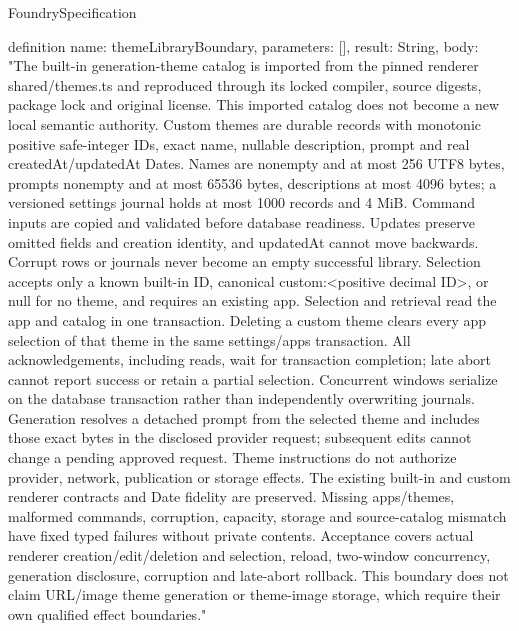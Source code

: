 \begin{lexlean}{FoundrySpecification}
\begin{semanticmodule}
definition{
  name: themeLibraryBoundary,
  parameters: [],
  result: String,
  body: "The built-in generation-theme catalog is imported from the pinned renderer shared/themes.ts and reproduced through its locked compiler, source digests, package lock and original license. This imported catalog does not become a new local semantic authority. Custom themes are durable records with monotonic positive safe-integer IDs, exact name, nullable description, prompt and real createdAt/updatedAt Dates. Names are nonempty and at most 256 UTF8 bytes, prompts nonempty and at most 65536 bytes, descriptions at most 4096 bytes; a versioned settings journal holds at most 1000 records and 4 MiB. Command inputs are copied and validated before database readiness. Updates preserve omitted fields and creation identity, and updatedAt cannot move backwards. Corrupt rows or journals never become an empty successful library. Selection accepts only a known built-in ID, canonical custom:<positive decimal ID>, or null for no theme, and requires an existing app. Selection and retrieval read the app and catalog in one transaction. Deleting a custom theme clears every app selection of that theme in the same settings/apps transaction. All acknowledgements, including reads, wait for transaction completion; late abort cannot report success or retain a partial selection. Concurrent windows serialize on the database transaction rather than independently overwriting journals. Generation resolves a detached prompt from the selected theme and includes those exact bytes in the disclosed provider request; subsequent edits cannot change a pending approved request. Theme instructions do not authorize provider, network, publication or storage effects. The existing built-in and custom renderer contracts and Date fidelity are preserved. Missing apps/themes, malformed commands, corruption, capacity, storage and source-catalog mismatch have fixed typed failures without private contents. Acceptance covers actual renderer creation/edit/deletion and selection, reload, two-window concurrency, generation disclosure, corruption and late-abort rollback. This boundary does not claim URL/image theme generation or theme-image storage, which require their own qualified effect boundaries."
}


\end{semanticmodule}
\end{lexlean}
